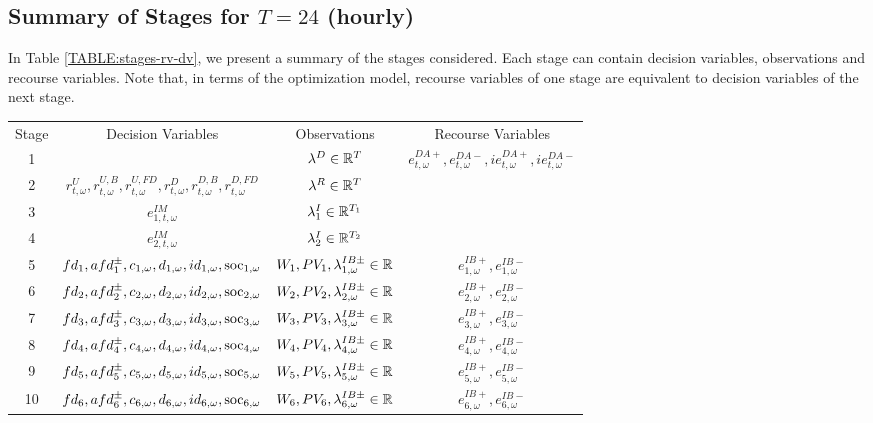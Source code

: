 \subsection{\texorpdfstring{Summary of Stages for $T = 24$ (hourly)}{Summary of Stages for T = 24 (hourly)}}

In Table \ref{TABLE:stages-rv-dv}, we present a summary of the stages considered. Each stage can contain decision variables, observations and recourse variables. Note that, in terms of the optimization model, recourse variables of one stage are equivalent to decision variables of the next stage.

\begin{table}[H]
\begin{tabular}{c c c c}
	Stage & Decision Variables & Observations & Recourse Variables \\
	1 & & $\lambda^D \in \mathbb{R}^{T}$& $e^{DA+}_{t, \omega}, e^{DA-}_{t, \omega}, ie^{DA+}_{t, \omega}, ie^{DA-}_{t, \omega}$\\
	2 & $r^U_{t, \omega}, r^{U, B}_{t, \omega}, r^{U, FD}_{t, \omega}, r^{D}_{t, \omega}, r^{D, B}_{t, \omega}, r^{D, FD}_{t, \omega}$ & $\lambda^R \in \mathbb{R}^{T}$& \\
	3 & $e^{IM}_{1, t, \omega}$ & $\lambda^I_1 \in \mathbb{R}^{T_1}$&  \\
	4 & $e^{IM}_{2, t, \omega}$ & $\lambda^I_2 \in \mathbb{R}^{T_2}$&  \\
	5 & $fd_1, afd^{\pm}_1, c_{1, \omega}, d_{1, \omega}, id_{1, \omega}, \text{soc}_{1, \omega}$ & $W_1, PV_1, \lambda^{IB\pm}_{1, \omega} \in \mathbb{R}$ & $e^{IB+}_{1, \omega}, e^{IB-}_{1, \omega}$\\
	6 & $fd_2, afd^{\pm}_2, c_{2, \omega}, d_{2, \omega}, id_{2, \omega}, \text{soc}_{2, \omega}$ & $W_2, PV_2, \lambda^{IB\pm}_{2, \omega} \in \mathbb{R}$ & $e^{IB+}_{2, \omega}, e^{IB-}_{2, \omega}$\\
	7& $fd_3, afd^{\pm}_3, c_{3, \omega}, d_{3, \omega}, id_{3, \omega}, \text{soc}_{3, \omega}$  & $W_3, PV_3, \lambda^{IB\pm}_{3, \omega} \in \mathbb{R}$ & $e^{IB+}_{3, \omega}, e^{IB-}_{3, \omega}$\\
	8& $fd_4, afd^{\pm}_4, c_{4, \omega}, d_{4, \omega}, id_{4, \omega}, \text{soc}_{4, \omega}$ & $W_4, PV_4, \lambda^{IB\pm}_{4, \omega} \in \mathbb{R}$ & $e^{IB+}_{4, \omega}, e^{IB-}_{4, \omega}$\\
	9& $fd_5, afd^{\pm}_5, c_{5, \omega}, d_{5, \omega}, id_{5, \omega}, \text{soc}_{5, \omega}$ & $W_5, PV_5, \lambda^{IB\pm}_{5, \omega} \in \mathbb{R}$ & $e^{IB+}_{5, \omega}, e^{IB-}_{5, \omega}$\\
	10& $fd_6, afd^{\pm}_6, c_{6, \omega}, d_{6, \omega}, id_{6, \omega}, \text{soc}_{6, \omega}$ & $W_6, PV_6, \lambda^{IB\pm}_{6, \omega} \in \mathbb{R}$ & $e^{IB+}_{6, \omega}, e^{IB-}_{6, \omega}$\\

\end{tabular}
\end{table}
